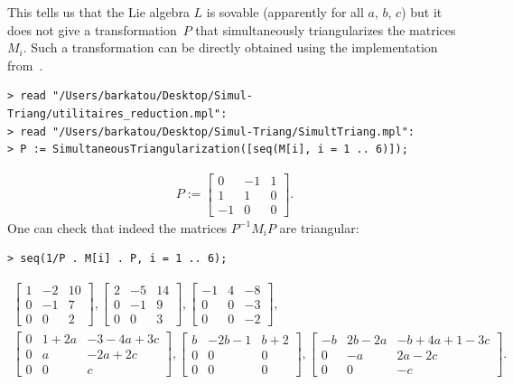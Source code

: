 \documentclass[pdftex]{sigma}
\numberwithin{equation}{section}
\begin{document}
\begin{Example}
This tells us that the Lie algebra $L$ is sovable (apparently for all $a$, $b$, $c$) but it does not give a transformation~$P$ that simultaneously triangularizes the matrices $M_i$. Such a transformation can be directly obtained using the implementation from~\cite{BC}.
\begin{verbatim}
> read "/Users/barkatou/Desktop/Simul-Triang/utilitaires_reduction.mpl":
> read "/Users/barkatou/Desktop/Simul-Triang/SimultTriang.mpl":
> P := SimultaneousTriangularization([seq(M[i], i = 1 .. 6)]);
\end{verbatim}
\begin{gather*}
P:=\left[ \begin{matrix} 0&-1&1\\ 1&1&0
\\ -1&0&0\end{matrix} \right].
\end{gather*}
One can check that indeed the matrices $P^{-1}M_iP$ are triangular:
\begin{verbatim}
> seq(1/P . M[i] . P, i = 1 .. 6);
\end{verbatim}
 \begin{gather*}\left[ \begin{matrix} 1&-2&10\\ 0&-1&7
	\\ 0&0&2\end{matrix} \right],
	\left[ \begin{matrix} 2&-5&14\\ 0&-1&9
	\\ 0&0&3\end{matrix} \right],
	\left[ \begin{matrix} -1&4&-8\\ 0&0&-3
	\\ 0&0&-2\end{matrix} \right], \\
	\left[ \begin{matrix} 0&1+2 a&-3-4 a+3 c\\ 0
	&a&-2 a+2 c\\ 0&0&c\end{matrix} \right]
	, \left[ \begin{matrix} b&-2 b-1&b+2\\ 0&0&0
	\\ 0&0&0\end{matrix} \right],
	\left[ \begin{matrix} -b&2 b-2 a&-b+4 a+1-3 c
	\\ 0&-a&2 a-2 c\\ 0&0&-c
	\end{matrix} \right].
	\end{gather*}


\end{Example}
\end{document}
